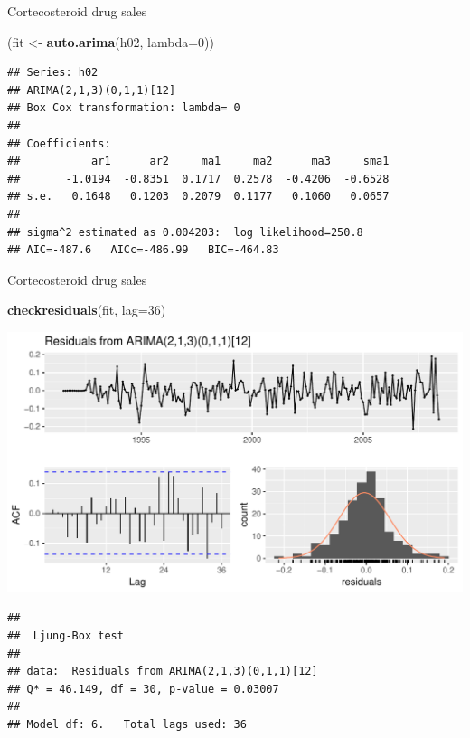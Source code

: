 \documentclass[14pt,ignorenonframetext,]{beamer}
\newenvironment{Shaded}{\begin{snugshade}}{\end{snugshade}}
\newcommand{\KeywordTok}[1]{\textcolor[rgb]{0.13,0.29,0.53}{\textbf{#1}}}
\newcommand{\DataTypeTok}[1]{\textcolor[rgb]{0.13,0.29,0.53}{#1}}
\newcommand{\DecValTok}[1]{\textcolor[rgb]{0.00,0.00,0.81}{#1}}
\newcommand{\StringTok}[1]{\textcolor[rgb]{0.31,0.60,0.02}{#1}}
\newcommand{\NormalTok}[1]{#1}
\begin{document}
\begin{frame}[fragile]{Cortecosteroid drug sales}

\fontsize{8}{10}\sf

\begin{Shaded}
\begin{Highlighting}[]
\NormalTok{(fit <-}\StringTok{ }\KeywordTok{auto.arima}\NormalTok{(h02, }\DataTypeTok{lambda=}\DecValTok{0}\NormalTok{))}
\end{Highlighting}
\end{Shaded}

\begin{verbatim}
## Series: h02 
## ARIMA(2,1,3)(0,1,1)[12] 
## Box Cox transformation: lambda= 0 
## 
## Coefficients:
##           ar1      ar2     ma1     ma2      ma3     sma1
##       -1.0194  -0.8351  0.1717  0.2578  -0.4206  -0.6528
## s.e.   0.1648   0.1203  0.2079  0.1177   0.1060   0.0657
## 
## sigma^2 estimated as 0.004203:  log likelihood=250.8
## AIC=-487.6   AICc=-486.99   BIC=-464.83
\end{verbatim}

\end{frame}

\begin{frame}[fragile]{Cortecosteroid drug sales}

\fontsize{10}{12}\sf

\begin{Shaded}
\begin{Highlighting}[]
\KeywordTok{checkresiduals}\NormalTok{(fit, }\DataTypeTok{lag=}\DecValTok{36}\NormalTok{)}
\end{Highlighting}
\end{Shaded}

\includegraphics{week_5_arima_files/figure-beamer/unnamed-chunk-53-1.pdf}

\begin{verbatim}
## 
##  Ljung-Box test
## 
## data:  Residuals from ARIMA(2,1,3)(0,1,1)[12]
## Q* = 46.149, df = 30, p-value = 0.03007
## 
## Model df: 6.   Total lags used: 36
\end{verbatim}

\end{frame}
\end{document}
